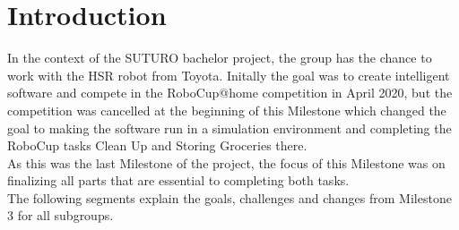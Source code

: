 \documentclass[main.tex]{subfiles}
\begin{document}
	
	\chapter{Introduction}

In the context of the SUTURO bachelor project, the group has the chance to work with the HSR robot from Toyota. Initally the goal was to create intelligent software and compete in the RoboCup@home competition in April 2020, but the competition was cancelled at the beginning of this Milestone which changed the goal to making the software run in a simulation environment and completing the RoboCup tasks Clean Up and Storing Groceries there.\\
As this was the last Milestone of the project, the focus of this Milestone was on finalizing all parts that are essential to completing both tasks.\\
The following segments explain the goals, challenges and changes from Milestone 3 for all subgroups.
	
\end{document}
